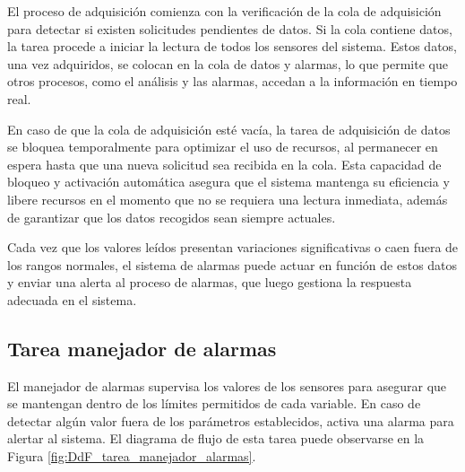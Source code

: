 El proceso de adquisición comienza con la verificación de la cola de adquisición para detectar si existen solicitudes pendientes de datos. Si la cola contiene datos, la tarea procede a iniciar la lectura de todos los sensores del sistema. Estos datos, una vez adquiridos, se colocan en la cola de datos y alarmas, lo que permite que otros procesos, como el análisis y las alarmas, accedan a la información en tiempo real.

En caso de que la cola de adquisición esté vacía, la tarea de adquisición de datos se bloquea temporalmente para optimizar el uso de recursos, al permanecer en espera hasta que una nueva solicitud sea recibida en la cola. Esta capacidad de bloqueo y activación automática asegura que el sistema mantenga su eficiencia y libere recursos en el momento que no se requiera una lectura inmediata, además de garantizar que los datos recogidos sean siempre actuales.

Cada vez que los valores leídos presentan variaciones significativas o caen fuera de los rangos normales, el sistema de alarmas puede actuar en función de estos datos y enviar una alerta al proceso de alarmas, que luego gestiona la respuesta adecuada en el sistema.

\subsection{Tarea manejador de alarmas}

El manejador de alarmas supervisa los valores de los sensores para asegurar que se mantengan dentro de los límites permitidos de cada variable. En caso de detectar algún valor fuera de los parámetros establecidos, activa una alarma para alertar al sistema. El diagrama de flujo de esta tarea puede observarse en la Figura \ref{fig:DdF_tarea_manejador_alarmas}.

